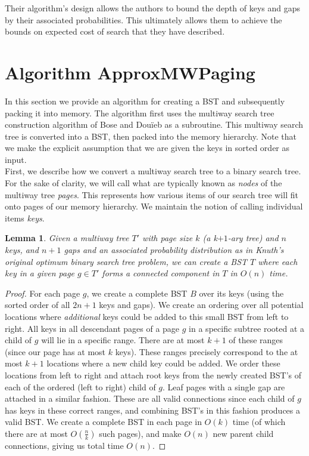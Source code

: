 \documentclass[letterpaper,12pt,titlepage,oneside,final]{book}
\theoremstyle{plain}
\newtheorem{lem}[thm]{Lemma}
\begin{document}
 Their algorithm's design allows the authors to bound the depth of keys and gaps by their associated probabilities. This ultimately allows them to achieve the bounds on expected cost of search that they have described. 

\section{Algorithm ApproxMWPaging}\label{Algorithm ApproxMWPaging}

In this section we provide an algorithm for creating a BST and subsequently packing it into memory. The algorithm first uses the multiway search tree construction algorithm of Bose and Dou\"{i}eb as a subroutine. This multiway search tree is converted into a BST, then packed into the memory hierarchy. Note that we make the explicit assumption that we are given the keys in sorted order as input. \\

First, we describe how we convert a multiway search tree to a binary search tree. For the sake of clarity, we will call what are typically known as \textit{nodes} of the multiway tree \textit{pages}. This represents how various items of our search tree will fit onto pages of our memory hierarchy. We maintain the notion of calling individual items \textit{keys}.

\begin{lem}\label{MWTBSTLem}
Given a multiway tree $T'$ with page size $k$ (a k$+1$-ary tree) and $n$ keys, and $n+1$ gaps and an associated probability distribution as in Knuth's original optimum binary search tree problem, we can create a BST $T$ where each key in a given page $g \in T'$ forms a connected component in $T$ in $O(n)$ time.
\end{lem}

\begin{proof}
For each page $g$, we create a complete BST $B$ over its keys (using the sorted order of all $2n+1$ keys and gaps). We create an ordering over all potential locations where \textit{additional} keys could be added to this small BST from left to right. All keys in all descendant pages of a page $g$ in a specific subtree rooted at a child of $g$ will lie in a specific range. There are at most $k+1$ of these ranges (since our page has at most $k$ keys). These ranges precisely correspond to the at most $k+1$ locations where a new child key could be added. We order these locations from left to right and attach root keys from the newly created BST's of each of the ordered (left to right) child of $g$. Leaf pages with a single gap are attached in a similar fashion. These are all valid connections since each child of $g$ has keys in these correct ranges, and combining BST's in this fashion produces a valid BST. We create a complete BST in each page in $O(k)$ time (of which there are at most $O(\frac{n}{k})$ such pages), and make $O(n)$ new parent child connections, giving us total time $O(n)$.
\end{proof}
\end{document}
